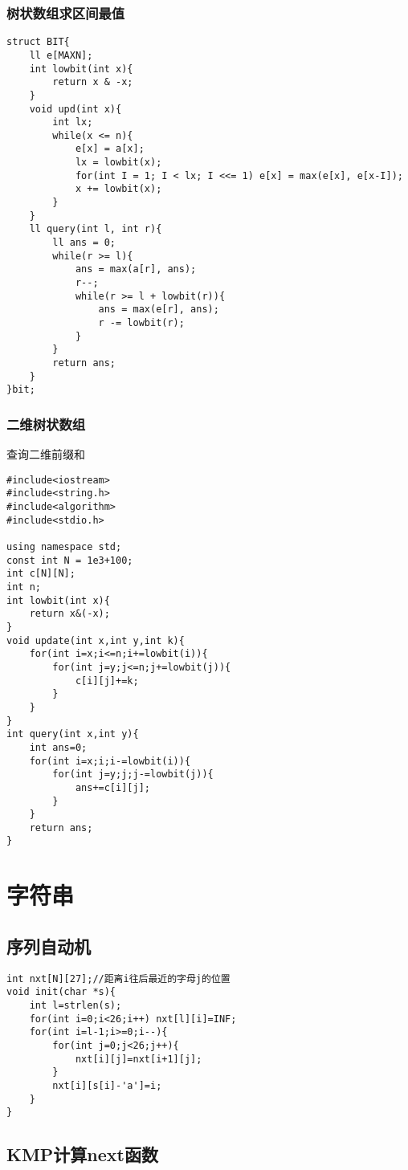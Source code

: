 \documentclass[twocolumn,a4]{article}
\begin{document}
\subsubsection{树状数组求区间最值}
\begin{lstlisting}
struct BIT{
    ll e[MAXN];
    int lowbit(int x){
        return x & -x;
    }
    void upd(int x){
        int lx;
        while(x <= n){
            e[x] = a[x];
            lx = lowbit(x);
            for(int I = 1; I < lx; I <<= 1) e[x] = max(e[x], e[x-I]);
            x += lowbit(x);
        }
    }
    ll query(int l, int r){
        ll ans = 0;
        while(r >= l){
            ans = max(a[r], ans);
            r--;
            while(r >= l + lowbit(r)){
                ans = max(e[r], ans);
                r -= lowbit(r);
            }
        }
        return ans;
    }
}bit;
\end{lstlisting}
\subsubsection{二维树状数组}
查询二维前缀和
\begin{lstlisting}
#include<iostream>
#include<string.h>
#include<algorithm>
#include<stdio.h>

using namespace std;
const int N = 1e3+100;
int c[N][N];
int n;
int lowbit(int x){
    return x&(-x);
}
void update(int x,int y,int k){
    for(int i=x;i<=n;i+=lowbit(i)){
        for(int j=y;j<=n;j+=lowbit(j)){
            c[i][j]+=k;
        }
    }
}
int query(int x,int y){
    int ans=0;
    for(int i=x;i;i-=lowbit(i)){
        for(int j=y;j;j-=lowbit(j)){
            ans+=c[i][j];
        }
    }
    return ans;
}
\end{lstlisting}
\section{字符串}
\subsection{序列自动机}
\begin{lstlisting}
int nxt[N][27];//距离i往后最近的字母j的位置
void init(char *s){
    int l=strlen(s);
    for(int i=0;i<26;i++) nxt[l][i]=INF;
    for(int i=l-1;i>=0;i--){
        for(int j=0;j<26;j++){
            nxt[i][j]=nxt[i+1][j];
        }
        nxt[i][s[i]-'a']=i;
    }
}
\end{lstlisting}
\subsection{KMP计算next函数}
\end{document}
